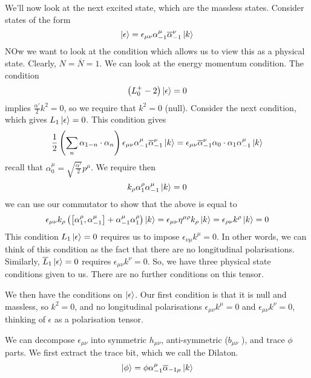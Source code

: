 \documentclass[11pt, oneside]{article}   	%
\theoremstyle{slanted}
\begin{document}
We'll now look at the next excited state, 
which are the massless states.
Consider states of the form 
\[
 \ket{ \epsilon }  = \epsilon _{ \mu \nu } \alpha _{ -1 } ^ \mu \overline{ \alpha } _{ - 1 } ^ \nu 
 \ket{ k } 
\]  NOw we want to look at the 
condition which allows us to 
view this as a physical state. 
Clearly, $ N = \overline{ N }  = 1 $. 
We can look at the energy momentum condition. 
The condition 
\[
 \left( L_0 ^ +  - 2  \right) \ket{ \epsilon }  = 0 
\] implies $ \frac{\alpha ' }{ 2 } k ^ 2  = 0 $, 
so we require that $ k ^ 2  = 0 $ (null). 
Consider the next condition, which 
gives $ L _ 1 \ket{ \epsilon }   =0 $. 
This condition gives 
\[
	\frac{1}{2 } \left( \sum _ n \alpha _{ 1 - n} \cdot  \alpha _ n  \right)  \epsilon 
	_{ \mu \nu } \alpha _{ - 1 } ^ \mu \overline{ \alpha } _{  - 1  }^{ \nu } \ket{ k } 
	= \epsilon _{ \mu \nu } \overline{ \alpha  }_{ - 1 } 
	^ \nu \alpha _ 0 \cdot  \alpha_ 1 \alpha _{ -  1 } ^ \mu  \ket{ k } 
\] recall that $ \alpha _ 0 ^ \mu  = \sqrt{ \frac{\alpha ' }{ 2 } }  p ^ \mu $. 
We require then 
\[
 k _ \rho \alpha _ 1 ^ \rho \alpha _{ - 1 } ^ \mu \ket{ k }  = 0 
\] we can use our commutator 
to show that the above is 
equal to 
\[
 \epsilon _{ \mu \nu } k _ \rho \left( \left[  \alpha _ 1 ^ \rho , \alpha _{ - 1 } ^ \mu  \right]  + 
 \alpha _{ - 1 } ^ \mu \alpha _ 1 ^ \rho  \right)  \ket{ k }  = \epsilon _{ \mu\nu  } 
 \eta ^{ \mu \rho } k _ \rho \ket{ k }  = \epsilon _{ \rho \nu } k ^ \rho \ket{ k }  = 0
\] 
This condition $ L _ 1 \ket{ \epsilon }   = 0 $ requires 
us to impose $ \epsilon _{ \nu \mu } k ^ \mu  = 0 $. 
In other words, we 
can think of this condition as the fact that 
there are no longitudinal polarisations.
Similarly, $ \overline{ L }_ 1 \ket{ \epsilon }  =0 $  requires 
$ \epsilon _{ \mu \nu } k ^ \nu  =0 $. 
So, 
we have three physical state conditions given to us. 
There are no further conditions on this tensor. 

We then have the conditions on $ \ket{ \epsilon } $.
Our first condition is that it is null and massless, 
so $ k ^ 2  = 0$, and no longitudinal polarisations 
$ \epsilon _{ \mu \nu } k ^ \mu  = 0 $ and $ \epsilon _{ \mu \nu  } k ^ \nu  = 0 $, 
thinking of 
$ \epsilon $ as a polarisation tensor. 


We can decompose $ \epsilon _{ \mu \nu } $ into 
symmetric $ h _{ \mu \nu } $, anti-symmetric ($ b _{ \mu \nu }  $  ), 
and trace $ \phi $ parts. 
We first extract the trace bit, 
which we call the Dilaton. 
\[
 \ket{ \phi }  = \phi \alpha _{ -  1 } ^ \mu \overline{ \alpha } _{ - 1 \mu } \ket{ k }  
\]  
\end{document}
